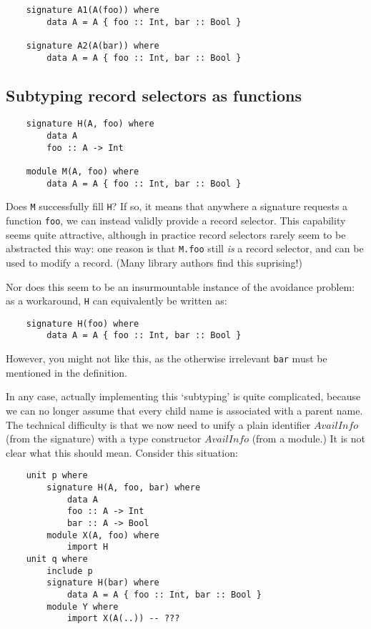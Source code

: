 \documentclass{article}
\newcommand{\I}[1]{\ensuremath{\mathit{#1}}}
\begin{document}
\begin{verbatim}
    signature A1(A(foo)) where
        data A = A { foo :: Int, bar :: Bool }

    signature A2(A(bar)) where
        data A = A { foo :: Int, bar :: Bool }
\end{verbatim}

\subsection{Subtyping record selectors as functions}

\begin{verbatim}
    signature H(A, foo) where
        data A
        foo :: A -> Int

    module M(A, foo) where
        data A = A { foo :: Int, bar :: Bool }
\end{verbatim}
%
Does \verb|M| successfully fill \verb|H|?  If so, it means that anywhere
a signature requests a function \verb|foo|, we can instead validly
provide a record selector.  This capability seems quite attractive,
although in practice record selectors rarely seem to be abstracted this
way: one reason is that \verb|M.foo| still \emph{is} a record selector,
and can be used to modify a record.  (Many library authors find this
suprising!)

Nor does this seem to be an insurmountable instance of the avoidance
problem:
as a workaround, \verb|H| can equivalently be written as:

\begin{verbatim}
    signature H(foo) where
        data A = A { foo :: Int, bar :: Bool }
\end{verbatim}
%
However, you might not like this, as the otherwise irrelevant \verb|bar| must be mentioned
in the definition.

In any case, actually implementing this `subtyping' is quite complicated, because we can no
longer assume that every child name is associated with a parent name.
The technical difficulty is that we now need to unify a plain identifier
\I{AvailInfo} (from the signature) with a type constructor \I{AvailInfo}
(from a module.)  It is not clear what this should mean.
Consider this situation:

\begin{verbatim}
    unit p where
        signature H(A, foo, bar) where
            data A
            foo :: A -> Int
            bar :: A -> Bool
        module X(A, foo) where
            import H
    unit q where
        include p
        signature H(bar) where
            data A = A { foo :: Int, bar :: Bool }
        module Y where
            import X(A(..)) -- ???
\end{verbatim}
\end{document}

